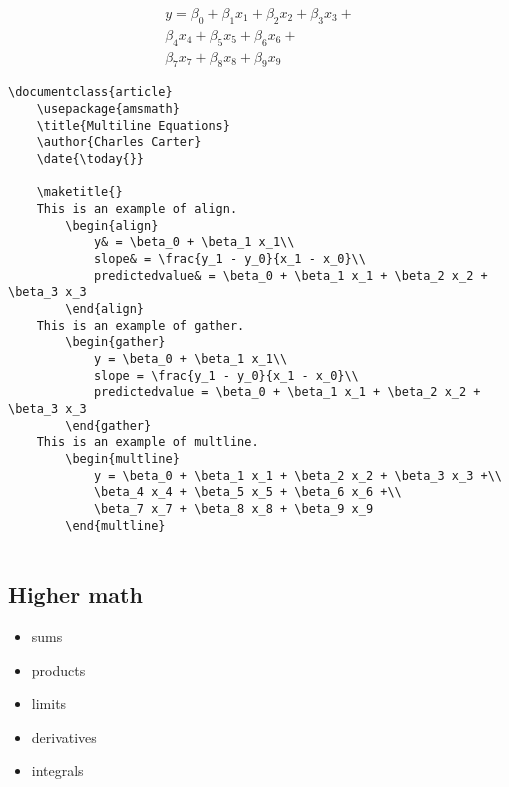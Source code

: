 		\begin{multline}
			y = \beta_0 + \beta_1 x_1 + \beta_2 x_2 + \beta_3 x_3 +\\
			\beta_4 x_4 + \beta_5 x_5 + \beta_6 x_6 +\\
			\beta_7 x_7 + \beta_8 x_8 + \beta_9 x_9
		\end{multline}
		
		\begin{verbatim}
\documentclass{article}
	\usepackage{amsmath}
    \title{Multiline Equations}
    \author{Charles Carter}
    \date{\today{}}
 
    \maketitle{}
	This is an example of align.
		\begin{align}
			y& = \beta_0 + \beta_1 x_1\\
			slope& = \frac{y_1 - y_0}{x_1 - x_0}\\
			predictedvalue& = \beta_0 + \beta_1 x_1 + \beta_2 x_2 + \beta_3 x_3
		\end{align}
	This is an example of gather.
		\begin{gather}
			y = \beta_0 + \beta_1 x_1\\
			slope = \frac{y_1 - y_0}{x_1 - x_0}\\
			predictedvalue = \beta_0 + \beta_1 x_1 + \beta_2 x_2 + \beta_3 x_3
		\end{gather}
	This is an example of multline.
		\begin{multline}
			y = \beta_0 + \beta_1 x_1 + \beta_2 x_2 + \beta_3 x_3 +\\
			\beta_4 x_4 + \beta_5 x_5 + \beta_6 x_6 +\\
			\beta_7 x_7 + \beta_8 x_8 + \beta_9 x_9
		\end{multline}
	    
        \end{verbatim}

        \subsection{Higher math}
        \label{Higher math}
        
        \begin{framed}
            \begin{itemize}
                \item{sums}
                \item{products}
                \item{limits}
                \item{derivatives}
                \item{integrals}
            \end{itemize}
        \end{framed}

